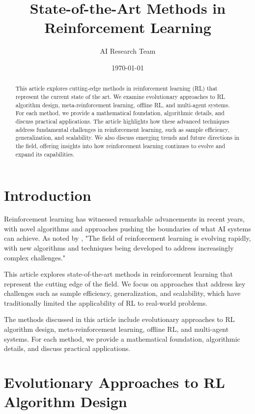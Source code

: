 \documentclass{article}
\title{State-of-the-Art Methods in Reinforcement Learning}
\author{AI Research Team}
\date{\today}
\begin{document}
\maketitle

\begin{abstract}
This article explores cutting-edge methods in reinforcement learning (RL) that represent the current state of the art. We examine evolutionary approaches to RL algorithm design, meta-reinforcement learning, offline RL, and multi-agent systems. For each method, we provide a mathematical foundation, algorithmic details, and discuss practical applications. The article highlights how these advanced techniques address fundamental challenges in reinforcement learning, such as sample efficiency, generalization, and scalability. We also discuss emerging trends and future directions in the field, offering insights into how reinforcement learning continues to evolve and expand its capabilities.
\end{abstract}

\section{Introduction}

Reinforcement learning has witnessed remarkable advancements in recent years, with novel algorithms and approaches pushing the boundaries of what AI systems can achieve. As noted by \cite{google2023}, "The field of reinforcement learning is evolving rapidly, with new algorithms and techniques being developed to address increasingly complex challenges."

This article explores state-of-the-art methods in reinforcement learning that represent the cutting edge of the field. We focus on approaches that address key challenges such as sample efficiency, generalization, and scalability, which have traditionally limited the applicability of RL to real-world problems.

The methods discussed in this article include evolutionary approaches to RL algorithm design, meta-reinforcement learning, offline RL, and multi-agent systems. For each method, we provide a mathematical foundation, algorithmic details, and discuss practical applications.

\section{Evolutionary Approaches to RL Algorithm Design}
\end{document}

